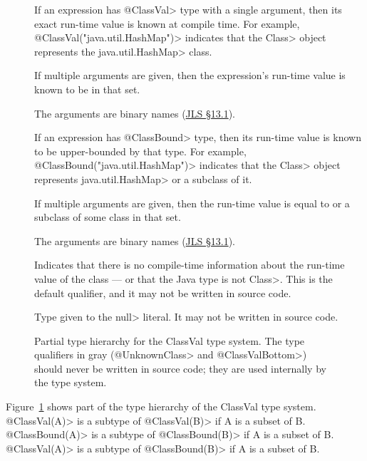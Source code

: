\begin{description}
\item[]
If an expression has \<@ClassVal> type with a single argument,
then its exact run-time value is known at compile time.
For example, \<@ClassVal("java.util.HashMap")>
indicates that the \<Class> object represents the \<java.util.HashMap> class.

If multiple arguments are given, then the expression's run-time value is
known to be in that set.

The arguments are binary names
(\href{https://docs.oracle.com/javase/specs/jls/se10/html/jls-13.html#jls-13.1}{JLS \S 13.1}).

\item[]
If an expression has \<@ClassBound> type, then its run-time value is known
to be upper-bounded by that type.
For example,
\<@ClassBound("java.util.HashMap")> indicates that the \<Class> object
represents \<java.util.HashMap> or a subclass of it.

If multiple arguments are given, then the run-time value is equal to or a
subclass of some class in that set.

The arguments are binary names
(\href{https://docs.oracle.com/javase/specs/jls/se10/html/jls-13.html#jls-13.1}{JLS \S 13.1}).

\item[] Indicates that there is no
  compile-time information about the run-time value of the class --- or
  that the Java type is not \<Class>.
  This is the default qualifier, and it may not be written in source code.

\item[] Type given to the \<null> literal.
  It may not be written in source code.
\end{description}
\begin{figure}
\caption{Partial type hierarchy for the ClassVal type system. The type qualifiers in gray (\<@UnknownClass>
and \<@ClassValBottom>) should never be written in source code; they are used internally by the type system.}
\label{fig-classval-hierarchy}
\end{figure}

Figure~\ref{fig-classval-hierarchy} shows part of the type hierarchy of  the
ClassVal type system.
\<@ClassVal(A)> is a subtype of \<@ClassVal(B)> if A is a subset of B.
\<@ClassBound(A)> is a subtype of \<@ClassBound(B)> if A is a subset of B.
\<@ClassVal(A)> is a subtype of \<@ClassBound(B)> if A is a subset of B.


